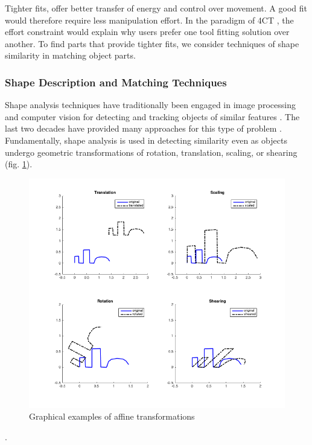 \documentclass[
    floatsintext
]{article}
\begin{document}
Tighter fits, offer better transfer of energy and control over movement.
A good fit would therefore require less manipulation effort.
In the paradigm of 4CT \cite{osiurak2014}, the effort constraint would explain why users prefer one tool fitting solution over another. 
To find parts that provide tighter fits, we consider techniques of shape similarity in matching object parts.

\subsubsection{Shape Description and Matching Techniques}
Shape analysis techniques have traditionally been engaged in image processing and computer vision for detecting and tracking objects of similar features \cite{loncaric1998,zhang2004,robert2012}.
The last two decades have provided many approaches for this type of problem \cite{loncaric1998,zhang2004,veltkamp2001,robert2012}.
Fundamentally, shape analysis is used in detecting similarity even as objects undergo geometric transformations of rotation, translation, scaling, or shearing (fig. \ref{fig:affine_transform}).

\begin{figure}[h]
  \centering
  \includegraphics[width=1\textwidth]{./figures/affine_transform.png}
  \caption{Graphical examples of affine transformations}
  \label{fig:affine_transform}
\end{figure}  .     
\end{document}

